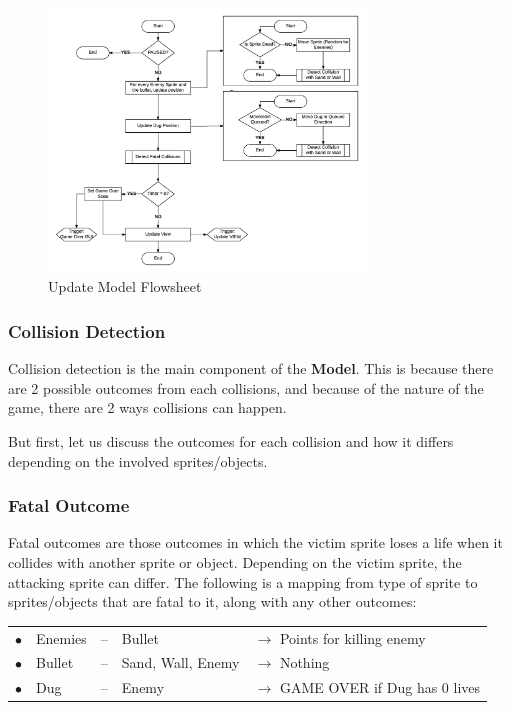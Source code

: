     \begin{figure}[H]
      \centering
      \includegraphics[width=0.75\textwidth]{images/update-model.png}
      \caption{\label{fig:update-model} Update Model Flowsheet}

    \end{figure}

    \subsubsection{Collision Detection}

    Collision detection is the main component of the \textbf{Model}. This is because there are 2 possible outcomes from each collisions, and because of the nature of the game, there are 2 ways collisions can happen.

    But first, let us discuss the outcomes for each collision and how it differs depending on the involved sprites/objects.

    \subsubsection*{Fatal Outcome}

    Fatal outcomes are those outcomes in which the victim sprite loses a life when it collides with another sprite or object. Depending on the victim sprite, the attacking sprite can differ.
    The following is a mapping from type of sprite to sprites/objects that are fatal to it, along with any other outcomes:

    \begin{tabular}{clcll}
      $\bullet$ & Enemies	& -- &  Bullet		&   $\rightarrow$ Points for killing enemy \\
      $\bullet$ & Bullet	& -- &  Sand, Wall, Enemy	&   $\rightarrow$ Nothing \\
      $\bullet$ & Dug		& -- &  Enemy		&   $\rightarrow$ GAME OVER if Dug has 0 lives
    \end{tabular}

